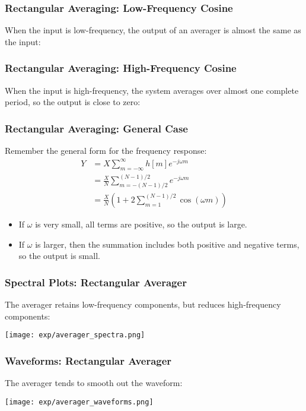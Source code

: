 \documentclass{beamer}
\begin{document}
\begin{frame}
  \frametitle{Rectangular Averaging: Low-Frequency Cosine}

  When the input is low-frequency, the output of an averager is almost
  the same as the input:

  \centerline{}
\end{frame}

\begin{frame}
  \frametitle{Rectangular Averaging: High-Frequency Cosine}

  When the input is high-frequency, the system averages over almost
  one complete period, so the output is close to zero:

  \centerline{}
\end{frame}

\begin{frame}
  \frametitle{Rectangular Averaging: General Case}

  Remember the general form for the frequency response:
  \begin{align*}
    Y &= X\sum_{m=-\infty}^\infty h[m]e^{-j\omega m}\\
    &= \frac{X}{N}\sum_{m=-(N-1)/2}^{(N-1)/2} e^{-j\omega m}\\
    &= \frac{X}{N}\left(1+2\sum_{m=1}^{(N-1)/2}\cos(\omega m)\right)
  \end{align*}
  \begin{itemize}
  \item If $\omega$ is very small, all terms are positive, so the
    output is large.
  \item If $\omega$ is larger, then the summation includes both
    positive and negative terms, so the output is small.
  \end{itemize}
\end{frame}

\begin{frame}
  \frametitle{Spectral Plots: Rectangular Averager}

  The averager retains low-frequency components, but reduces
  high-frequency components:
  \centerline{\texttt{[image: exp/averager\_spectra.png]}}
\end{frame}

\begin{frame}
  \frametitle{Waveforms: Rectangular Averager}

  The averager tends to smooth out the waveform:
  \centerline{\texttt{[image: exp/averager\_waveforms.png]}}
\end{frame}
\end{document}
